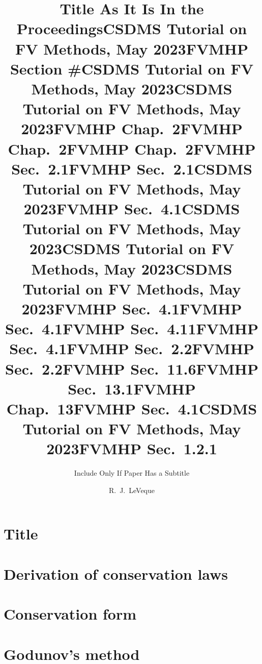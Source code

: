 \documentclass{beamer}
\title[Short Paper Title] %
{Title As It Is In the Proceedings}
\subtitle
{Include Only If Paper Has a Subtitle}
\author[R.\ J.\ LeVeque, University of Washington]{R.\ J.\ LeVeque}
\institute[UW] %
\date[]
\newcommand{\mkslide}[1]{\title{CSDMS Tutorial on FV Methods, May 2023}
   }
\newcommand{\mkslidelabel}[2]{\title{#2}}
\begin{document}


\section{Title}
\mkslide{csdms2023/title-csdms2023.be}
\mkslidelabel{csdms2023/links.be}{FVMHP Section \#}

\mkslide{csdms2023/part1.be}
\mkslide{csdms2023/part2.be}

\section{Derivation of conservation laws}
\mkslidelabel{fvm/deriv1a.be}{FVMHP Chap.\ 2}
\mkslidelabel{fvm/deriv1b.be}{FVMHP Chap.\ 2}
\mkslidelabel{fvm/deriv2.be}{FVMHP Chap.\ 2}

\mkslidelabel{csdms2023/advflux1q.be}{FVMHP Sec.\ 2.1}
\mkslidelabel{fvm/advseq0.be}{FVMHP Sec.\ 2.1}

\mkslide{csdms2023/methods1fdm.be}
\mkslidelabel{fvm/fd1dt.be}{FVMHP Sec.\ 4.1}
\mkslide{csdms2023/methods1fem1.be}
\mkslide{csdms2023/methods1fem2.be}
\mkslide{csdms2023/methods1fvm1.be}

\mkslidelabel{fvm/fv2a.be}{FVMHP Sec.\ 4.1}
\mkslidelabel{fvm/fv4.be}{FVMHP Sec.\ 4.1}
\mkslidelabel{fvm/upwind-flux.be}{FVMHP Sec.\ 4.11}
\mkslidelabel{fvm/fdfv.be}{FVMHP Sec.\ 4.1}

\mkslidelabel{fvm/diffflux.be}{FVMHP Sec.\ 2.2}
\mkslidelabel{fvm/advdiff.be}{FVMHP Sec.\ 2.2}
\mkslidelabel{fvm/advrpvv.be}{FVMHP Sec.\ 11.6}


\mkslidelabel{csdms2023/swderiv1a.be}{FVMHP Sec.\ 13.1}
\mkslidelabel{csdms2023/shockform1b.be}{FVMHP Chap.\ 13}

\section{Conservation form}
\mkslidelabel{fvm/consform.be}{FVMHP Sec.\ 4.1}

\section{Godunov's method}
\mkslide{csdms2023/godunov1.be}
\mkslidelabel{fvm/rp1a.be}{FVMHP Sec.\ 1.2.1}
\end{document}
